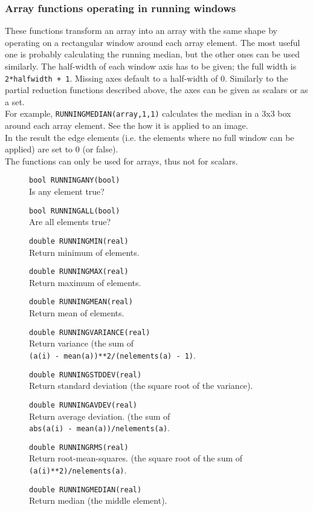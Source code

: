 \subsubsection{Array functions operating in running windows}
These functions transform an array into an array with the same shape
by operating on a rectangular window around each array element.
The most useful one is probably calculating the running median, but
the other ones can be used similarly.
The half-width of each window axis has to be given; the full width is
\texttt{2*halfwidth + 1}. Missing axes default to a half-width of 0.
Similarly to the partial reduction functions described above, the axes
can be given as scalars or as a set.
\\For example,
\texttt{RUNNINGMEDIAN(array,1,1)} calculates the median
in a 3x3 box around each array element.
See the  how it is applied to an image.
\\In the result the edge elements (i.e. the elements where no full
window can be applied) are set to 0 (or false).
\\The functions can only be used for arrays, thus not for scalars.
\begin{description}
  \item[] \texttt{bool RUNNINGANY(bool)}\\
    Is any element true?
  \item[] \texttt{bool RUNNINGALL(bool)}\\
    Are all elements true?
  \item[] \texttt{double RUNNINGMIN(real)}\\
    Return minimum of elements.
  \item[] \texttt{double RUNNINGMAX(real)}\\
    Return maximum of elements.
  \item[] \texttt{double RUNNINGMEAN(real)}\\
    Return mean of elements.
  \item[] \texttt{double RUNNINGVARIANCE(real)}\\
    Return variance (the sum of
    \\\texttt{(a(i) - mean(a))**2/(nelements(a) - 1)}.
  \item[] \texttt{double RUNNINGSTDDEV(real)}\\
    Return standard deviation (the square root of the variance).
  \item[] \texttt{double RUNNINGAVDEV(real)}\\
    Return average deviation. (the sum of 
    \\\texttt{abs(a(i) - mean(a))/nelements(a)}.
  \item[] \texttt{double RUNNINGRMS(real)}\\
    Return root-mean-squares. (the square root of the sum of
    \\\texttt{(a(i)**2)/nelements(a)}.
  \item[] \texttt{double RUNNINGMEDIAN(real)}\\
    Return median (the middle element).
\end{description}

